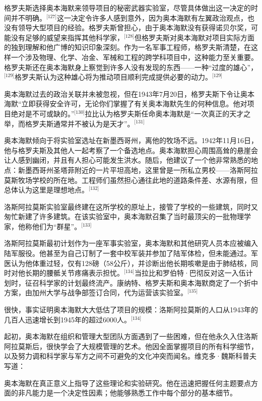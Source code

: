 格罗夫斯选择奥本海默来领导项目的秘密武器实验室，尽管具体做出这一决定的时间并不明确。\(^\text{[127]}\)这一决定令许多人感到意外，因为奥本海默有左翼政治观点，也没有领导大型项目的经验。格罗夫斯曾担心，由于奥本海默没有获得诺贝尔奖，可能没有足够的威望来指挥其他科学家，\(^\text{[128]}\)但格罗夫斯对奥本海默对项目实际方面的独到理解和他广博的知识印象深刻。作为一名军事工程师，格罗夫斯清楚，在这样一个涉及物理、化学、冶金、军械和工程的跨学科项目中，这种能力至关重要。格罗夫斯还在奥本海默身上察觉到许多人没有发现的东西——一种“过度的雄心”，\(^\text{[129]}\)格罗夫斯认为这种雄心将为推动项目顺利完成提供必要的动力。\(^\text{[129]}\)

奥本海默过去的政治关联并未被忽视，但在1943年7月20日，格罗夫斯下令让奥本海默“立即获得安全许可，无论你们掌握了有关奥本海默先生的何种信息。他对项目绝对是不可或缺的。”\(^\text{[130]}\)拉比认为格罗夫斯任命奥本海默是“一次真正的天才之举，而格罗夫斯通常并不被认为是天才”。\(^\text{[131]}\)

奥本海默倾向于将实验室选址在新墨西哥州，离他的牧场不远。1942年11月16日，他与格罗夫斯及其他人一起考察了一个备选地点。奥本海默担心周围高耸的悬崖会让人感到幽闭，并且有人担心可能发生洪水。随后，他建议了一个他非常熟悉的地点：新墨西哥州圣塔菲附近的一片平坦高地，这里曾是一所私立男校——洛斯阿拉莫斯牧场学校的所在地。工程师们虽然担心通往此地的道路条件差、水源有限，但总体认为这里是理想地点。\(^\text{[132]}\)

洛斯阿拉莫斯实验室最终建在这所学校的原址上，接管了学校的一些建筑，同时又匆忙新建了许多建筑。在该实验室中，奥本海默召集了当时最顶尖的一批物理学家，他称他们为“群星”。\(^\text{[133]}\)

洛斯阿拉莫斯最初计划作为一座军事实验室，奥本海默和其他研究人员本应被编入陆军服役。他甚至为自己订制了一套中校军装并参加了陆军体检，但未能通过。军医认为他体重过轻，仅有128磅（58公斤），并诊断出他长期咳嗽是由于肺结核，同时对他长期的腰骶关节疼痛表示担忧。\(^\text{[134]}\)当拉比和罗伯特·巴彻反对这一入伍计划时，征召科学家的计划最终流产。康纳特、格罗夫斯和奥本海默商定了一个折中方案，由加州大学与战争部签订合同，代为运营该实验室。\(^\text{[135]}\)

很快，事实证明奥本海默大大低估了项目的规模：洛斯阿拉莫斯的人口从1943年的几百人迅速增长到1945年的超过6000人。\(^\text{[134]}\)

起初，奥本海默在组织和管理大型团队方面遇到了一些困难，但在他永久入住洛斯阿拉莫斯后，很快学会了大规模管理的艺术。他因全面掌握项目的所有科学细节，以及努力调和科学家与军方之间不可避免的文化冲突而闻名。维克多·魏斯科普夫写道：

奥本海默在真正意义上指导了这些理论和实验研究。他在迅速把握任何主题要点方面的非凡能力是一个决定性因素；他能够熟悉工作中每个部分的基本细节。

